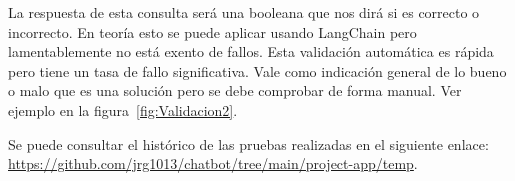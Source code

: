 La respuesta de esta consulta será una booleana que nos dirá si es correcto o incorrecto. En teoría esto se puede aplicar usando LangChain pero lamentablemente no está exento de fallos. Esta validación automática es rápida pero tiene un tasa de fallo significativa. Vale como indicación general de lo bueno o malo que es una solución pero se debe comprobar de forma manual. Ver ejemplo en la figura~\ref{fig:Validacion2}.

Se puede consultar el histórico de las pruebas realizadas en el siguiente enlace: \url{https://github.com/jrg1013/chatbot/tree/main/project-app/temp}.

